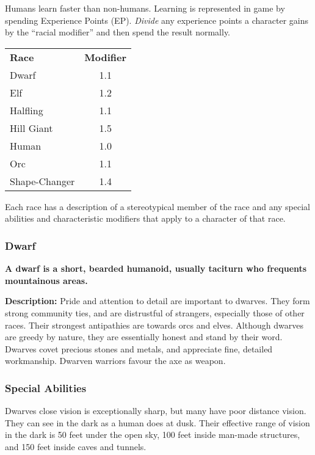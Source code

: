 \begin{multicols*}{3}
Humans learn faster than non-humans.  Learning is represented in game
by spending Experience Points (EP). \emph{Divide} any experience
points a character gains by the ``racial modifier'' and then spend the
result normally.

\begin{tabular}{lc}
\textbf{Race}	& \textbf{Modifier} \\
Dwarf		& 1.1 \\
Elf		& 1.2 \\
Halfling	& 1.1 \\
Hill Giant	& 1.5 \\
Human		& 1.0 \\
Orc		& 1.1 \\
Shape-Changer	& 1.4 \\
\end{tabular}

Each race has a description of a stereotypical member of the race and
any special abilities and characteristic modifiers that apply to a
character of that race.

\subsubsection{Dwarf}

\textbf{A dwarf is a short, bearded humanoid, usually taciturn who
frequents mountainous areas.}

\textbf{Description:} Pride and attention to detail are important to
dwarves. They form strong community ties, and are distrustful of
strangers, especially those of other races. Their strongest
antipathies are towards orcs and elves. Although dwarves are greedy by
nature, they are essentially honest and stand by their word.  Dwarves
covet precious stones and metals, and appreciate fine, detailed
workmanship. Dwarven warriors favour the axe as weapon.

\subsubsection{Special Abilities}

\begin{Enumerate}
\item
Dwarves close vision is exceptionally sharp, but many have poor
distance vision. They can see in the dark as a human does at
dusk. Their effective range of vision in the dark is 50 feet under the
open sky, 100 feet inside man-made structures, and 150 feet inside
caves and tunnels.


\end{Enumerate}
\end{multicols*}

